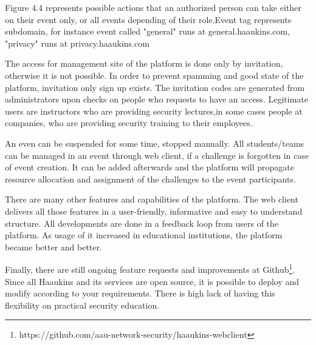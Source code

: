 Figure 4.4 represents possible actions that an authorized person can take either on their event only, or all events depending of their role.Event tag represents subdomain, for instance event called "general" runs at general.haaukins.com, "privacy" runs at privacy.haaukins.com 

The access for management site of the platform is done only by invitation, otherwise it is not possible. In order to prevent spamming and good state of the platform, invitation only sign up exists. The invitation codes are generated from administrators upon checks on people who requests to have an access. Legitimate users are instructors who are providing security lectures,in some cases people at companies,  who are providing security training to their employees. 

An even can be suspended for some time, stopped manually. All students/teams can be managed in an event through web client, if a challenge is forgotten in case of event creation. It can be added afterwards and the platform will propagate resource allocation and assignment of the challenges to the event participants. 

There are many other features and capabilities of the platform. The web client delivers all those features in a user-friendly, informative and easy to understand structure. All developments are done in a feedback loop from users of the platform. As usage of it increased in educational institutions, the platform became better and better. 

Finally, there are still ongoing feature requests and improvements at Github\footnote{https://github.com/aau-network-security/haaukins-webclient}. Since all Haaukins and its services are open source, it is possible to deploy and modify according to your requirements. There is high lack of having this flexibility on practical security education. 



